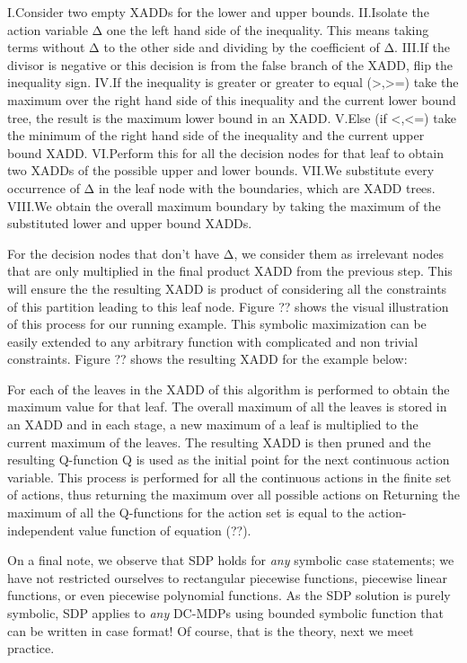 \documentclass[letterpaper]{article}
\renewcommand{\-}{\text{-}}
\begin{document}
I.Consider two empty XADDs for the lower and upper bounds.
II.Isolate the action variable Δ one the left hand side of the inequality. This means taking terms without Δ to the other side and dividing by the coefficient of Δ. 
III.If the divisor is negative or this decision is from the false branch of the XADD, flip the inequality sign. 
IV.If the inequality is greater or greater to equal (>,>=) take the maximum over the right hand side of this inequality and the current lower bound tree, the result is the maximum lower bound in an XADD.
V.Else (if <,<=) take the minimum of the right hand side of the inequality and the current upper bound XADD. 
VI.Perform this for all the decision nodes for that leaf to obtain two XADDs of the possible upper and lower bounds. 
VII.We substitute every occurrence of Δ in the leaf node with the boundaries, which are XADD trees.
VIII.We obtain the overall maximum boundary by taking the maximum of the substituted lower and upper bound XADDs. 

For the decision nodes that don’t have Δ, we consider them as irrelevant nodes that are only multiplied in the final product XADD from the previous step. This will ensure the the resulting XADD is product of considering all the constraints of this partition leading to this leaf node. Figure ?? shows the visual illustration of this process for our running example. 
This symbolic maximization can be easily extended to any arbitrary function with complicated and non trivial constraints. Figure ?? shows the resulting XADD for the example below: 

For each of the leaves in the XADD of   this algorithm is performed to obtain the maximum value for that leaf. The overall maximum of all the leaves is stored in an XADD and in each stage, a new maximum of a leaf is multiplied to the current maximum of the leaves. The resulting XADD is then pruned and the resulting Q-function Q is used as the initial point for the next continuous action variable. This process is performed for all the continuous actions in the finite set of actions, thus returning the maximum over all possible actions on   Returning the maximum of all the Q-functions for the action set is equal to the action-independent value function of equation (??). 


On a final note, we observe that SDP holds for \emph{any} symbolic
case statements; we have not restricted ourselves to rectangular
piecewise functions, piecewise linear functions, or even piecewise
polynomial functions.  As the SDP solution is purely symbolic,
SDP applies to \emph{any} DC-MDPs using bounded symbolic function 
that can be written in case format!  Of course, that is the theory,
next we meet practice.
\end{document}
